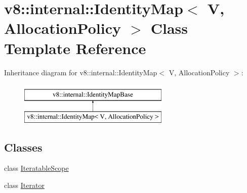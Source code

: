 \hypertarget{classv8_1_1internal_1_1IdentityMap}{}\section{v8\+:\+:internal\+:\+:Identity\+Map$<$ V, Allocation\+Policy $>$ Class Template Reference}
\label{classv8_1_1internal_1_1IdentityMap}
Inheritance diagram for v8\+:\+:internal\+:\+:Identity\+Map$<$ V, Allocation\+Policy $>$\+:\begin{figure}[H]
\begin{center}
\leavevmode
\includegraphics[height=2.000000cm]{classv8_1_1internal_1_1IdentityMap}
\end{center}
\end{figure}
\subsection*{Classes}
\begin{DoxyCompactItemize}
\item 
class \mbox{\hyperlink{classv8_1_1internal_1_1IdentityMap_1_1IteratableScope}{Iteratable\+Scope}}
\item 
class \mbox{\hyperlink{classv8_1_1internal_1_1IdentityMap_1_1Iterator}{Iterator}}
\end{DoxyCompactItemize}
